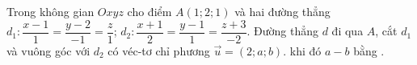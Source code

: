 \begin{ex}
	Trong không gian $Oxyz$ cho điểm $ A(1;2;1) $ và hai đường thẳng $d_{1}\colon \dfrac{x-1}{1}=\dfrac{y-2}{-1}=\dfrac{z}{1}$; $d_{2}\colon \dfrac{x+1}{2}=\dfrac{y-1}{1}=\dfrac{z+3}{-2}$. Đường thẳng $ d $ đi qua $ A $, cắt $ d_1 $ và vuông góc với $ d_2 $ có véc-tơ chỉ phương $\overrightarrow{u}=(2;a;b)$. khi đó $a-b$ bằng . 
\end{ex}
